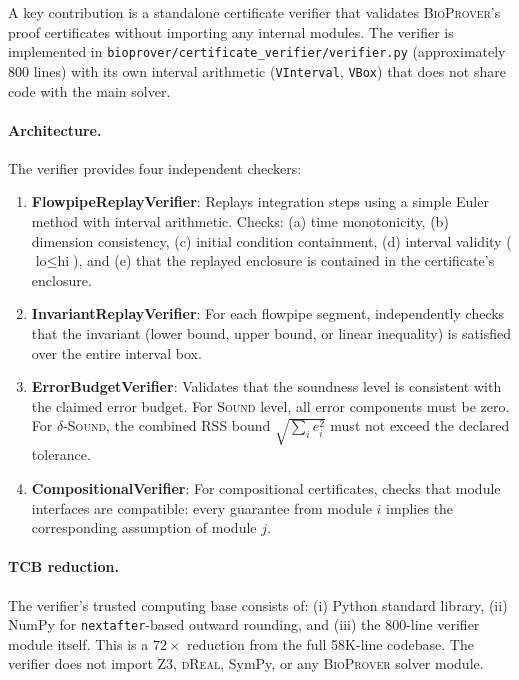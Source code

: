 \documentclass[11pt]{article}
\newcommand{\bioprover}{\textsc{BioProver}}
\newcommand{\dreal}{\textsc{dReal}}
\begin{document}
A key contribution is a standalone certificate verifier that validates
\bioprover{}'s proof certificates without importing any internal modules.
The verifier is implemented in \texttt{bioprover/certificate\_verifier/verifier.py}
(approximately 800 lines) with its own interval arithmetic (\texttt{VInterval},
\texttt{VBox}) that does not share code with the main solver.

\paragraph{Architecture.}
The verifier provides four independent checkers:

\begin{enumerate}
\item \textbf{FlowpipeReplayVerifier}: Replays integration steps using
  a simple Euler method with interval arithmetic. Checks:
  (a) time monotonicity, (b) dimension consistency, (c) initial condition
  containment, (d) interval validity ($\text{lo} \leq \text{hi}$), and
  (e) that the replayed enclosure is contained in the certificate's enclosure.

\item \textbf{InvariantReplayVerifier}: For each flowpipe segment,
  independently checks that the invariant (lower bound, upper bound,
  or linear inequality) is satisfied over the entire interval box.

\item \textbf{ErrorBudgetVerifier}: Validates that the soundness level
  is consistent with the claimed error budget. For \textsc{Sound} level,
  all error components must be zero. For \textsc{$\delta$-Sound}, the
  combined RSS bound $\sqrt{\sum_i e_i^2}$ must not exceed the declared tolerance.

\item \textbf{CompositionalVerifier}: For compositional certificates,
  checks that module interfaces are compatible: every guarantee from
  module $i$ implies the corresponding assumption of module $j$.
\end{enumerate}

\paragraph{TCB reduction.}
The verifier's trusted computing base consists of:
(i) Python standard library, (ii) NumPy for \texttt{nextafter}-based
outward rounding, and (iii) the 800-line verifier module itself.
This is a $72\times$ reduction from the full 58K-line codebase.
The verifier does not import Z3, \dreal{}, SymPy, or any \bioprover{}
solver module.
\end{document}
